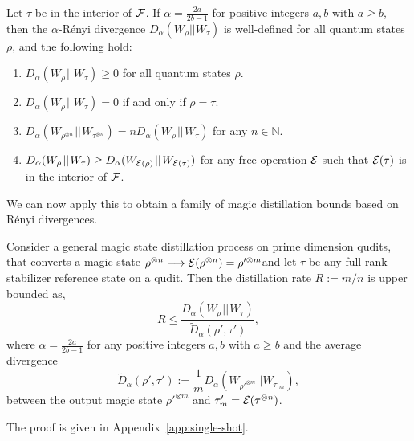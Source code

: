 \documentclass[pra,
aps,
twocolumn,
superscriptaddress,
groupedaddress,
nofootinbib,
reprint
]{revtex4-1}
\begin{document}
\begin{theorem}\label{thm:Da_props} 
	Let $\tau$ be in the interior of ${\mathcal F}$. 
	If $\alpha = \frac{2a}{2b-1}$ for positive integers $a,b$ with $a \geq b$, then the $\alpha$-R\'{e}nyi divergence $D_\alpha(W_\rho || W_\tau)$ is well-defined for all quantum states $\rho$, and the following hold:
\begin{enumerate}
\item $D_\alpha(W_\rho \hspace{1pt}||\hspace{1pt} W_\tau) \ge 0$ for all quantum states $\rho$.
\item  $D_\alpha(W_\rho \hspace{1pt}||\hspace{1pt} W_\tau) = 0$ if and only if $\rho =\tau$.
\item $D_\alpha(W_{\rho^{\otimes n}} \hspace{1pt}||\hspace{1pt} W_{\tau^{\otimes n}}) = n D_\alpha(W_\rho \hspace{1pt}||\hspace{1pt} W_\tau)$ for any $n \in \mathbb{N}$.
\item $D_\alpha(W_\rho \hspace{1pt}||\hspace{1pt} W_\tau) \geq D_\alpha (W_{{\mathcal E}(\rho)} \hspace{1pt}||\hspace{1pt} W_{{\mathcal E}(\tau)})$ for any free operation ${\mathcal E}$ such that ${\mathcal E}(\tau)$ is in the interior of ${\mathcal F}$.
\end{enumerate}
\end{theorem}

We can now apply this to obtain a family of magic distillation bounds based on R\'{e}nyi divergences.
\begin{theorem}\label{thm:entropic_bounds}
	Consider a general magic state distillation process on prime dimension qudits, that converts a magic state $\rho^{\otimes n} \longrightarrow {\mathcal E}(\rho^{\otimes n})=\rho'^{\otimes m}$and let $\tau$ be any full-rank stabilizer reference state on a qudit. Then the distillation rate $R := m/n$ is upper bounded as,
	\begin{equation}
		R \leq \frac{D_{\alpha}(W_\rho \hspace{1pt}||\hspace{1pt} W_\tau)}{\tilde{D}_\alpha( \rho', \tau')},
	\end{equation}
	where $\alpha = \frac{2a}{2b-1}$ for any positive integers $a,b$ with $a \geq b$ and the average divergence
	\begin{equation}
\tilde{D}_\alpha( \rho', \tau') := \frac{1}{m} D_\alpha (W_{\rho'^{\otimes m}} || W_{\tau'_m}),
\end{equation}
between the output magic state $\rho'^{\otimes m}$ and $\tau'_m = {\mathcal E}(\tau^{\otimes n})$.
\end{theorem}
The proof is given in Appendix~\ref{app:single-shot}. 
\end{document}
